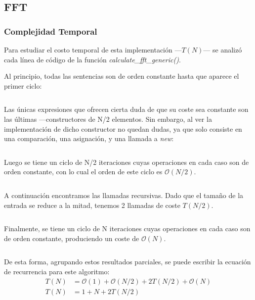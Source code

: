\documentclass{article}
\begin{document}
  \subsection{FFT}
    \subsubsection{Complejidad Temporal}
      Para estudiar el costo temporal de esta implementación ---$T(N)$--- se analizó
    cada línea de código de la función \textit{calculate\_fft\_generic()}.\par
    Al principio, todas las sentencias son de orden constante hasta que
    aparece el primer ciclo:
    \begin{lstlisting}
    \end{lstlisting}
      Las únicas expresiones que ofrecen cierta duda de que su coste sea 
    constante son las últimas ---constructores de N/2 elementos. Sin embargo,
    al ver la implementación de dicho constructor no quedan dudas, ya que solo
    consiste en una comparación, una asignación, y una llamada a \textit{new}:
    \begin{lstlisting}
    \end{lstlisting}
      Luego se tiene un ciclo de N/2 iteraciones cuyas operaciones en cada caso
    son de orden constante, con lo cual el orden de este ciclo es $\mathcal{O}(N/2)$.
    \begin{lstlisting}
    \end{lstlisting}
      A continuación encontramos las llamadas recursivas. Dado que el tamaño
     de la entrada se reduce a la mitad, tenemos 2 llamadas de coste $T(N/2)$.
    \begin{lstlisting}
    \end{lstlisting}
      Finalmente, se tiene un ciclo de N iteraciones cuyas operaciones en cada 
    caso son de orden constante, produciendo un coste de $\mathcal{O}(N)$.
    \begin{lstlisting}
    \end{lstlisting}
      De esta forma, agrupando estos resultados parciales, se puede escribir la
     ecuación de recurrencia para este algoritmo:
    \begin{align*}
      T(N) &= \mathcal{O}(1) + \mathcal{O}(N/2) + 2T(N/2) + \mathcal{O}(N) \\
      T(N) &= 1 + N + 2T(N/2) \\
    \end{align*}
\end{document}
